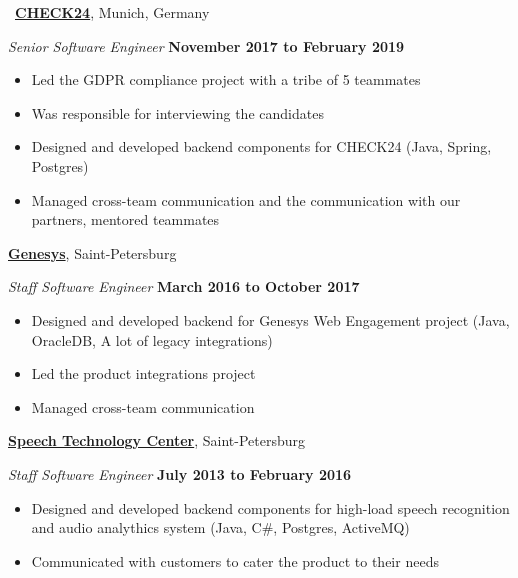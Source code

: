 \documentclass[10pt]{article}
\newcommand{\halfblankline}{\quad\vspace{-0.5\baselineskip}\pagebreak[3]}
\begin{document}
\vspace{0.2in}
\
\halfblankline
\href{https://www.check24.de}{\textbf{CHECK24}}, Munich, Germany
\begin{outerlist}
    \item[] \textit{Senior Software Engineer}
      \hfill \textbf{November 2017 to February 2019}
      \begin{itemize}
        \item Led the GDPR compliance project with a tribe of 5 teammates
        \item Was responsible for interviewing the candidates
        \item Designed and developed backend components for CHECK24 (Java, Spring, Postgres)
        \item Managed cross-team communication and the communication with our partners, mentored teammates
        \end{itemize}
      \end{outerlist}
\pagebreak
\href{http://www.genesys.com}{\textbf{Genesys}}, Saint-Petersburg
\begin{outerlist}
    \item[] \textit{Staff Software Engineer}
      \hfill \textbf{March 2016 to October 2017}
      \begin{itemize}
        \item Designed and developed backend for Genesys Web Engagement project (Java, OracleDB, A lot of legacy integrations)
        \item Led the product integrations project
        \item Managed cross-team communication
        \end{itemize}
      \end{outerlist}
\href{http://speechpro.com/}{\textbf{Speech Technology Center}}, Saint-Petersburg
\begin{outerlist}
    \item[] \textit{Staff Software Engineer}
            \hfill \textbf{July 2013 to February 2016}
            \begin{itemize}
               \item Designed and developed backend components for high-load speech recognition and audio analythics system (Java, C\#, Postgres, ActiveMQ)
               \item Communicated with customers to cater the product to their needs
            \end{itemize}
\end{outerlist}
\end{document}
